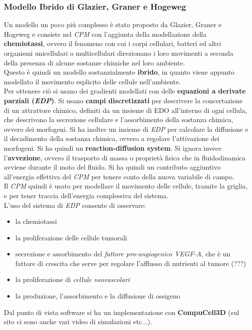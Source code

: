 \documentclass[a4paper,12pt, oneside]{book}
\begin{document}
\subsubsection{Modello Ibrido di Glazier, Graner e Hogeweg}
Un modello un poco più complesso è stato proposto da Glazier, Graner e Hogeweg e
consiste nel \textit{CPM} con l'aggiunta della modellazione della
\textbf{chemiotassi}, ovvero il fenomeno con cui i corpi cellulari, batteri ed
altri organismi unicellulari o multicellulari direzionano i loro movimenti a
seconda della presenza di alcune sostanze chimiche nel loro ambiente.\\
Questo è quindi un modello sostanzialmente \textbf{ibrido}, in quanto viene
appunto modellato il movimento esplicito delle cellule nell'ambiente.\\
Per ottenere ciò si usano dei gradienti modellati con delle \textbf{equazioni a
  derivate parziali (\textit{EDP})}. Si usano \textbf{campi discretizzati} per
descrivere la concertazione di un attrattore chimico, definiti da un insieme di
EDO all'interno di ogni cellula, che descrivono  la secrezione cellulare e
l'assorbimento della sostanza chimica, ovvero dei morfogeni. Si ha inoltre un
insieme di \textit{EDP} per calcolare la diffusione e il decadimento della
sostanza chimica, ovvero a regolare l'attivazione dei morfogeni. Si ha quindi un
\textbf{reaction-diffusion system}. Si ignora invece l'\textbf{avvezione},
ovvero il trasporto di massa o proprietà fisica che in fluidodinamica avviene
durante il moto del fluido. Si ha quindi un contributo aggiuntivo all'energia
effettiva del \textit{CPM} per tenere conto della nuova variabile di campo. \\
Il \textit{CPM} quindi è usato per modellare il movimento delle cellule, tramite
la griglia, e per tener traccia dell'energia complessiva del sistema.\\
L'uso del sistema di \textit{EDP} consente di osservare:
\begin{itemize}
  \item la chemiotassi
  \item la proliferazione delle cellule tumorali
  \item secrezione e assorbimento del \textit{fattore pro-angiogenico VEGF-A},
  che è un fattore di crescita che serve per regolare l'afflusso di nutrienti al
  tumore (???)
  \item la proliferazione di \textit{cellule neovascolari}
  \item la produzione, l'assorbimento e la diffusione di ossigeno 
\end{itemize}
Dal punto di vista software si ha un implementazione con \textbf{CompuCell3D}
(sul sito ci sono anche vari video di simulazioni etc$\ldots$).
\end{document}
